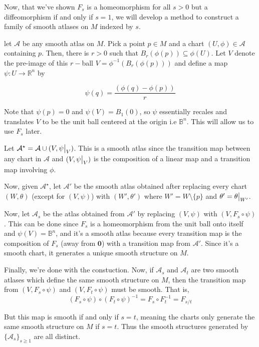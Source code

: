 \documentclass{article}
\newcommand{\R}{\mathbb{R}}
\newcommand{\restr}[2]{{%
  \left.\kern-\nulldelimiterspace %
  #1 %
  \vphantom{\big|} %
  \right|_{#2} %
  }}
\begin{document}
\vskip 0.5cm
Now, that we've shown $F_s$ is a homeomorphism for all $s > 0$ but a diffeomorphism if and only if $s = 1$, we will develop a method to construct a family of smooth atlases on $M$ indexed by $s$.

\vskip 0.25cm
let $\mathcal{A}$ be any smooth atlas on $M$. Pick a point $p \in M$ and a chart $(U, \phi) \in \mathcal{A}$ containing $p$. Then, there is $r > 0$ such that $B_r(\phi(p)) \subseteq \phi(U)$. Let $V$ denote the pre-image of this $r-$ball $V = \phi^{-1} \left( B_r(\phi(p)) \right)$ and define a map $\psi : U \rightarrow \R^n$ by  

\[ \psi(q) = \frac{\left( \phi(q) - \phi(p) \right)}{r} \]

Note that $\psi(p) = 0$ and $\psi(V) = B_1(0)$, so $\psi$ essentially recales and translates $V$ to be the unit ball centered at the origin i.e $\mathbb{B}^n$. This will allow us to use $F_s$ later. 

\vskip 0.25cm
Let $\mathcal{A}^{\star} = \mathcal{A} \cup (V, \restr{\psi}{V})$. This is a smooth atlas since the transition map between any chart in $\mathcal{A}$ and $(V, \restr{\psi}{V})$ is the composition of a linear map and a transition map involving $\phi$.

\vskip 0.25cm
Now, given $\mathcal{A}^{\star}$, let $\mathcal{A}'$ be the smooth atlas obtained after replacing every chart $(W, \theta)$ (except for $(V, \psi)$) with $(W', \theta')$ where $W'= W \setminus \{p\}$ and $\theta' = \restr{\theta}{W'}$.

\vskip 0.25cm
Now, let $\mathcal{A}_{s}$ be the atlas obtained from $\mathcal{A}'$ by replacing $(V, \psi)$ with $(V, F_s \circ \psi)$. This can be done since $F_s$ is a homeomorphism from the unit ball onto itself and $\psi(V) = \mathbb{B}^n$, and it's a smooth atlas because every transition map is the composition of $F_s$ (away from $\mathbf{0}$) with a transition map from $\mathcal{A}'$. Since it's a smooth chart, it generates a unique smooth structure on $M$.

\vskip 0.25cm
Finally, we're done with the constuction. Now, if $\mathcal{A}_s$ and $\mathcal{A}_t$ are two smooth atlases which define the same smooth structure on $M$, then the transition map from $(V, F_s \circ \psi)$ and $(V, F_t \circ \psi)$ must be smooth. That is, 
\[ (F_s \circ \psi) \circ (F_t \circ \psi)^{-1} = F_s \circ F_t^{-1} = F_{s/t} \]

\vskip 0.25cm
But this map is smooth if and only if $s = t$, meaning the charts only generate the same smooth structure on $M$ if $s = t$. Thus the smooth structures generated by $\{ \mathcal{A}_s \}_{s \geq 1}$ are all distinct. 
\end{document}
